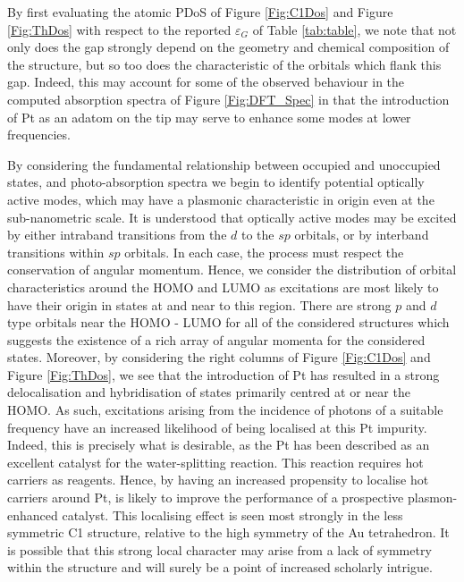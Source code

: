 By first evaluating the atomic PDoS of Figure  \ref{Fig:C1Dos} and Figure \ref{Fig:ThDos} with respect to the reported $\varepsilon_{G}$ of Table \ref{tab:table}, we note that not only does the gap strongly depend on the geometry and chemical composition of the structure, but so too does the characteristic of the orbitals which flank this gap. Indeed, this may account for some of the observed behaviour in the computed absorption spectra of Figure \ref{Fig:DFT_Spec} in that the introduction of Pt as an adatom on the tip may serve to enhance some modes at lower frequencies.

By considering the fundamental relationship between occupied and unoccupied states, and photo-absorption spectra we begin to identify potential optically active modes, which may have a plasmonic characteristic in origin even at the sub-nanometric scale. It is understood that optically active modes may be excited by either intraband transitions from the $d$ to the $sp$ orbitals, or by interband transitions within $sp$ orbitals. In each case, the process must respect the conservation of angular momentum. Hence, we consider the distribution of orbital characteristics around the HOMO and LUMO as excitations are most likely to have their origin in states at and near to this region. There are strong $p$ and $d$ type orbitals near the HOMO - LUMO for all of the considered structures which suggests the existence of a rich array of angular momenta for the considered states. Moreover, by considering the right columns of Figure \ref{Fig:C1Dos} and Figure \ref{Fig:ThDos}, we see that the introduction of Pt has resulted in a strong delocalisation and hybridisation of states primarily centred at or near the HOMO. As such, excitations arising from the incidence of photons of a suitable frequency have an increased likelihood of being localised at this Pt impurity. Indeed, this is precisely what is desirable, as the Pt has been described as an excellent catalyst for the water-splitting reaction. This reaction requires hot carriers as reagents. Hence, by having an increased propensity to localise hot carriers around Pt, is likely to improve the performance of a prospective plasmon-enhanced catalyst. This localising effect is seen most strongly in the less symmetric C1 structure, relative to the high symmetry of the Au tetrahedron. It is possible that this strong local character may arise from a lack of symmetry within the structure and will surely be a point of increased scholarly intrigue.

